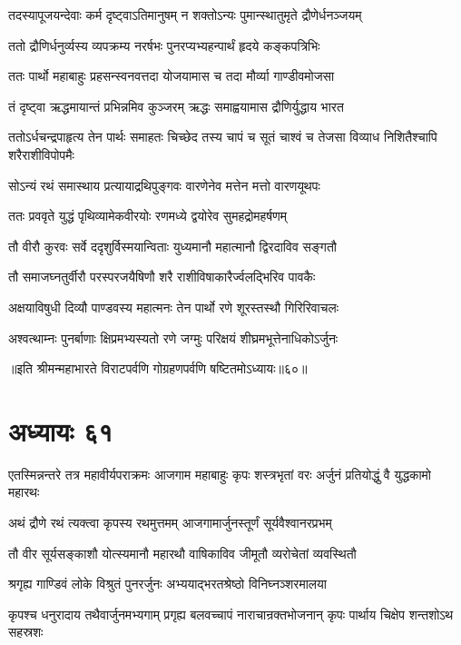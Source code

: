 \twolineshloka
{तदस्यापूजयन्देवाः कर्म दृष्ट्वाऽतिमानुषम्}
{न शक्तोऽन्यः पुमान्स्थातुमृते द्रौणेर्धनञ्जयम्}


\twolineshloka
{ततो द्रौणिर्धनुर्व्यस्य व्यपक्रम्य नरर्षभः}
{पुनरप्यभ्यहन्पार्थं हृदये कङ्कपत्रिभिः}



\twolineshloka
{ततः पार्थो महाबाहुः प्रहसन्स्वनवत्तदा}
{योजयामास च तदा मौर्व्या गाण्डीवमोजसा}


\twolineshloka
{तं दृष्ट्वा ऋद्धमायान्तं प्रभिन्नमिव कुञ्जरम्}
{ऋद्धः समाह्वयामास द्रौणिर्युद्धाय भारत}


\threelineshloka
{ततोऽर्धचन्द्रपाहृत्य तेन पार्थः समाहतः}
{चिच्छेद तस्य चापं च सूतं चाश्वं च तेजसा}
{विव्याध निशितैश्चापि शरैराशीविपोपमैः}


\twolineshloka
{सोऽन्यं रथं समास्थाय प्रत्यायाद्रथिपुङ्गवः}
{वारणेनेव मत्तेन मत्तो वारणयूथपः}


\twolineshloka
{ततः प्रववृते युद्धं पृथिव्यामेकवीरयोः}
{रणमध्ये द्वयोरेव सुमहद्रोमहर्षणम्}


\twolineshloka
{तौ वीरौ कुरवः सर्वे ददृशुर्विस्मयान्विताः}
{युध्यमानौ महात्मानौ द्विरदाविव सङ्गतौ}


\twolineshloka
{तौ समाजघ्नतुर्वीरौ परस्परजयैषिणौ}
{शरै राशीविषाकारैर्ज्वलद्भिरिव पावकैः}


\twolineshloka
{अक्षयाविषुधी दिव्यौ पाण्डवस्य महात्मनः}
{तेन पार्थो रणे शूरस्तस्थौ गिरिरिवाचलः}


\twolineshloka
{अश्वत्थाम्नः पुनर्बाणाः क्षिप्रमभ्यस्यतो रणे}
{जग्मुः परिक्षयं शीघ्रमभूत्तेनाधिकोऽर्जुनः}

॥इति श्रीमन्महाभारते विराटपर्वणि गोग्रहणपर्वणि षष्टितमोऽध्यायः॥६०॥

\chapter{अध्यायः ६१}

\threelineshloka
{एतस्मिन्नन्तरे तत्र महावीर्यपराक्रमः}
{आजगाम महाबाहुः कृपः शस्त्रभृतां वरः}
{अर्जुनं प्रतियोद्धुं वै युद्धकामो महारथः}


\twolineshloka
{अथं द्रौणे रथं त्यक्त्वा कृपस्य रथमुत्तमम्}
{आजगामार्जुनस्तूर्णं सूर्यवैश्वानरप्रभम्}


\twolineshloka
{तौ वीर सूर्यसङ्काशौ योत्स्यमानौ महारथौ}
{वाषिकाविव जीमूतौ व्यरोचेतां व्यवस्थितौ}


\twolineshloka
{श्रगृह्य गाण्डिवं लोके विश्रुतं पुनरर्जुनः}
{अभ्ययाद्भरतश्रेष्ठो विनिघ्नञ्शरमालया}


\onelineshloka
{कृपश्च धनुरादाय तथैवार्जुनमभ्यगाम्}
\twolineshloka
{प्रगृह्य बलवच्चापं नाराचान्रक्तभोजनान्}
{कृपः पार्थाय चिक्षेप शन्तशोऽथ सहस्रशः}


